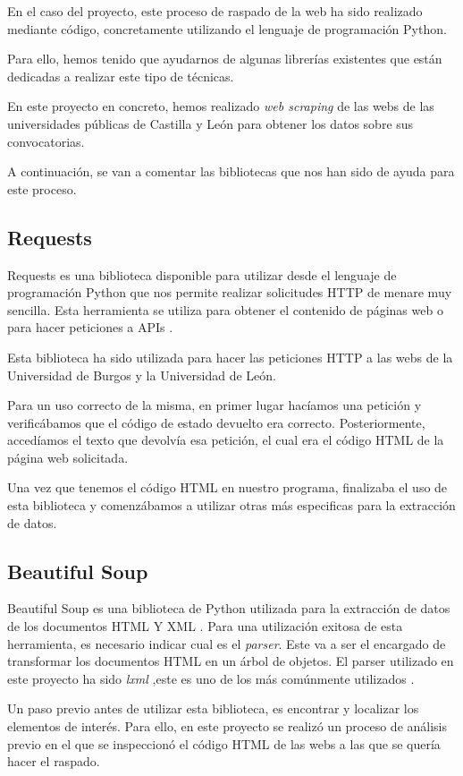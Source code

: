 En el caso del proyecto, este proceso de raspado de la web ha sido realizado mediante código, concretamente utilizando el lenguaje de programación Python.

Para ello, hemos tenido que ayudarnos de algunas librerías existentes que están dedicadas a realizar este tipo de técnicas.

En este proyecto en concreto, hemos realizado \textit{web scraping} de las webs de las universidades públicas de Castilla y León para obtener los datos sobre sus convocatorias.

A continuación, se van a comentar las bibliotecas que nos han sido de ayuda para este proceso.

\subsection{Requests}
Requests es una biblioteca disponible para utilizar desde el lenguaje de programación Python que nos permite realizar solicitudes HTTP de menare muy sencilla. Esta herramienta se utiliza para obtener el contenido de páginas web o para hacer peticiones a APIs \cite{requests:latex}.

Esta biblioteca ha sido utilizada para hacer las peticiones HTTP a las webs de la Universidad de Burgos y la Universidad de León. 

Para un uso correcto de la misma, en primer lugar hacíamos una petición y verificábamos que el código de estado devuelto era correcto. Posteriormente, accedíamos el texto que devolvía esa petición, el cual era el código HTML de la página web solicitada. 

Una vez que tenemos el código HTML en nuestro programa, finalizaba el uso de esta biblioteca y comenzábamos a utilizar otras más especificas para la extracción de datos.

\subsection{Beautiful Soup}
Beautiful Soup es una biblioteca de Python utilizada para la extracción de datos de los documentos HTML Y XML \cite{soup:latex}. Para una utilización exitosa de esta herramienta, es necesario indicar cual es el \textit{parser}. Este va a ser el encargado de transformar los documentos HTML en un árbol de objetos. El parser utilizado en este proyecto ha sido \textit{lxml} ,este es uno de los más comúnmente utilizados .

Un paso previo antes de utilizar esta biblioteca, es encontrar y localizar los elementos de interés. Para ello, en este proyecto se realizó un proceso de análisis previo en el que se inspeccionó el código HTML de las webs a las que se quería hacer el raspado.

